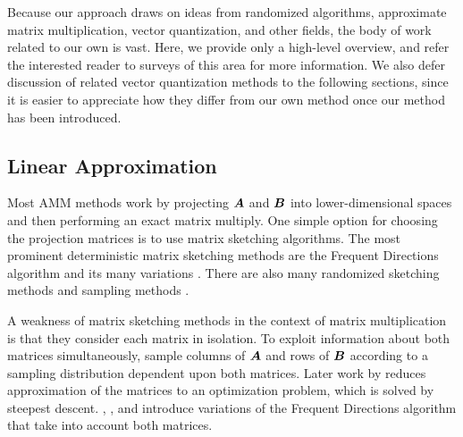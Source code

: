 
Because our approach draws on ideas from randomized algorithms, approximate matrix multiplication, vector quantization, and other fields, the body of work related to our own is vast.
Here, we provide only a high-level overview, and refer the interested reader to
surveys of this area \cite{learningToHashSurvey, hashingSimilaritySurvey, isvd} for more information.
We also defer discussion of related vector quantization methods to the following sections, since it is easier to appreciate how they differ from our own method once our method has been introduced.

\vspace{-1mm}
\subsection{Linear Approximation}
Most AMM methods work by projecting $\bm{A}$ and $\bm{B}$ into lower-dimensional spaces and then performing an exact matrix multiply.
One simple option for choosing the projection matrices is to use matrix sketching algorithms. The most prominent deterministic matrix sketching methods are the Frequent Directions algorithm \cite{liberty_simple_2012, ghashami_frequent_2016} and its many variations \cite{teng_fast_2019, francis_practical_2018, ye_frequent_2016, huang_near_2019, luo_robust_2019, francis_improvement_2018}. There are also many randomized sketching methods \cite{sarlos_improved_2006, kyrillidis_approximate_2014, pagh_compressed_2013, hashjl,osnap} and sampling methods \cite{drineas_fast_2006-1, drineas_fast_2006-2}.

A weakness of matrix sketching methods in the context of matrix multiplication is that they consider each matrix in isolation. To exploit information about both matrices simultaneously, \citet{drineas_fast_2006} sample columns of $\bm{A}$ and rows of $\bm{B}$ according to a sampling distribution dependent upon both matrices. Later work by \citet{manne_fast_2014} reduces approximation of the matrices to an optimization problem, which is solved by steepest descent. \citet{mroueh_co-occuring_2016}, \citet{ye_frequent_2016}, and \citet{francis_improvement_2018} introduce variations of the Frequent Directions algorithm that take into account both matrices.

